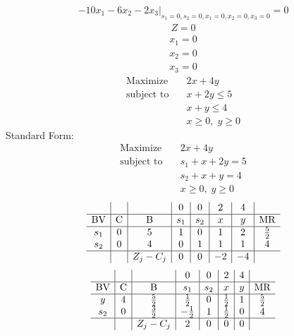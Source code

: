 \documentclass{article}
\begin{document}
\begin{align*}
\left.-10x_{1} - 6x_{2} - 2x_{3}\right|_{s_{1}=0,s_{2}=0,x_{1}=0,x_{2}=0,x_{3}=0}=0\end{align*}
\begin{align*}
Z=0\end{align*}
\begin{align*}
x_{1}=0\end{align*}
\begin{align*}
x_{2}=0\end{align*}
\begin{align*}
x_{3}=0\end{align*}
\begin{align*}
\text{Maximize} \quad & 2x + 4y\\
\text{subject to} \quad
& x + 2y\le5\\
& x + y\le4\\
& x\ge0,\; y\ge0\end{align*}
Standard Form:\\
\begin{align*}
\text{Maximize} \quad & 2x + 4y\\
\text{subject to} \quad
& s_{1} + x + 2y=5\\
& s_{2} + x + y=4\\
& x\ge0,\; y\ge0\end{align*}
\begin{align*}
\begin{array}{c|c|c|c|c|c|c|c}
 &  &  & 0 & 0 & 2 & 4 & \\
\hline
\text{BV} & \text{C} & \text{B} & s_{1} & s_{2} & x & y & \text{MR} \\
\hline
s_{1} & 0 & 5 & 1 & 0 & 1 & 2 & \frac{5}{2} \\
s_{2} & 0 & 4 & 0 & 1 & 1 & 1 & 4 \\
\hline
 &  & Z_j-C_j & 0 & 0 & -2 & -4 & \\
\end{array}
\end{align*}
\begin{align*}
\begin{array}{c|c|c|c|c|c|c|c}
 &  &  & 0 & 0 & 2 & 4 & \\
\hline
\text{BV} & \text{C} & \text{B} & s_{1} & s_{2} & x & y & \text{MR} \\
\hline
y & 4 & \frac{5}{2} & \frac{1}{2} & 0 & \frac{1}{2} & 1 & \frac{5}{2} \\
s_{2} & 0 & \frac{3}{2} & -\frac{1}{2} & 1 & \frac{1}{2} & 0 & 4 \\
\hline
 &  & Z_j-C_j & 2 & 0 & 0 & 0 & \\
\end{array}
\end{align*}
\end{document}
